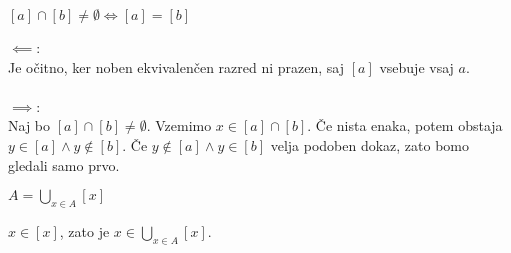 \begin{trditev}
    $[a] \cap [b] \neq \emptyset \iff [a] = [b]$
\end{trditev}
\begin{dokaz}
$\impliedby$: \\
Je očitno, ker noben ekvivalenčen razred ni prazen, saj $[a]$ vsebuje vsaj $a$.\\
\\
$\implies$:\\
Naj bo $[a] \cap [b] \neq \emptyset$.
Vzemimo $x \in [a] \cap [b]$.
Če nista enaka, potem obstaja $y \in [a] \wedge y \notin [b]$.
Če $y \notin [a] \wedge y \in [b]$ velja podoben dokaz, zato bomo gledali samo prvo.
\end{dokaz}

\begin{trditev}
    $A = \bigcup_{x \in A} [x]$
\end{trditev}
\begin{dokaz}
$x \in [x]$, zato je $x \in \bigcup_{x \in A} [x]$.
\end{dokaz}



